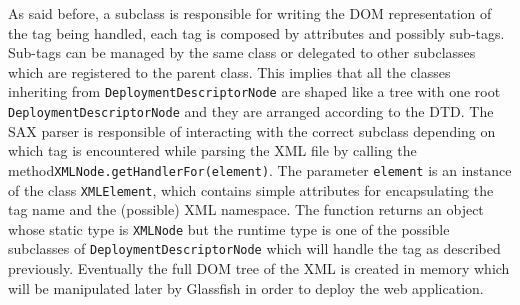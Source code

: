 As said before, a subclass is responsible for writing the DOM representation of the tag being handled, each tag is composed by attributes and possibly sub-tags. Sub-tags can be managed by the same class or delegated to other subclasses which are registered to the parent class. \newline This implies that all the classes inheriting from \texttt{DeploymentDescriptorNode} are shaped like a tree with one root \texttt{DeploymentDescriptorNode} and they are arranged according to the DTD. \newline The SAX parser is responsible of interacting with the correct subclass depending on which tag is encountered while parsing the XML file by calling the method\newline\texttt{XMLNode.getHandlerFor(element)}. The parameter \texttt{element} is an instance of the class \texttt{XMLElement}, which contains simple attributes for encapsulating the tag name and the (possible) XML namespace. The function returns an object whose static type is \texttt{XMLNode} but the runtime type is one of the possible subclasses of \newline \texttt{DeploymentDescriptorNode} which will handle the tag as described previously. \newline
Eventually the full DOM tree of the XML is created in memory which will be manipulated later by Glassfish in order to deploy the web application.